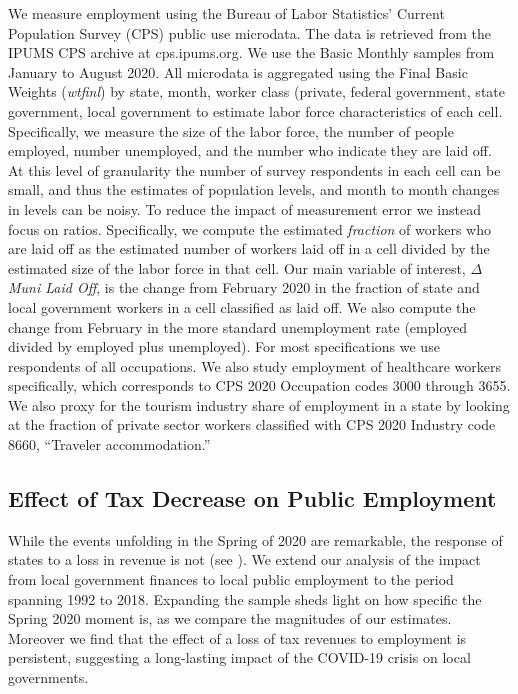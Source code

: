 We measure employment using the Bureau of Labor Statistics' Current Population Survey (CPS) public use microdata. The data is retrieved from the IPUMS CPS archive at cps.ipums.org. We use the Basic Monthly samples from January to August 2020. All microdata is aggregated using the Final Basic Weights (\emph{wtfinl}) by state, month, worker class (private, federal government, state government, local government to estimate labor force characteristics of each cell. Specifically, we measure the size of the labor force, the number of people employed, number unemployed, and the number who indicate they are laid off. At this level of granularity the number of survey respondents in each cell can be small, and thus the estimates of population levels, and month to month changes in levels can be noisy. To reduce the impact of measurement error we instead focus on ratios. Specifically, we compute the estimated \emph{fraction} of workers who are laid off as the estimated number of workers laid off in a cell divided by the estimated size of the labor force in that cell. Our main variable of interest, $\Delta$\emph{Muni Laid Off}, is the change from February 2020 in the fraction of state and local government workers in a cell classified as laid off. We also compute the change from February in the more standard unemployment rate (employed divided by employed plus unemployed). For most specifications we use respondents of all occupations. We also study employment of healthcare workers specifically, which corresponds to CPS 2020 Occupation codes 3000 through 3655.  We also proxy for the tourism industry share of employment in a state by looking at the fraction of private sector workers classified with CPS 2020 Industry code 8660, ``Traveler accommodation.''








\subsection*{Effect of Tax Decrease on Public Employment}
\label{subsec:empirics:generalemp}

While the events unfolding in the Spring of 2020 are remarkable, the response of states to a loss in revenue is not (see \cite{Poterba:1994:FiscalCrises}). 
We extend our analysis of the impact from local government finances to local public employment to the period spanning 1992 to 2018.
Expanding the sample sheds light on how specific the Spring 2020 moment is, as we compare the magnitudes of our estimates. 
Moreover we find that the effect of a loss of tax revenues to employment is persistent, suggesting a long-lasting impact of the COVID-19 crisis on local governments. 

